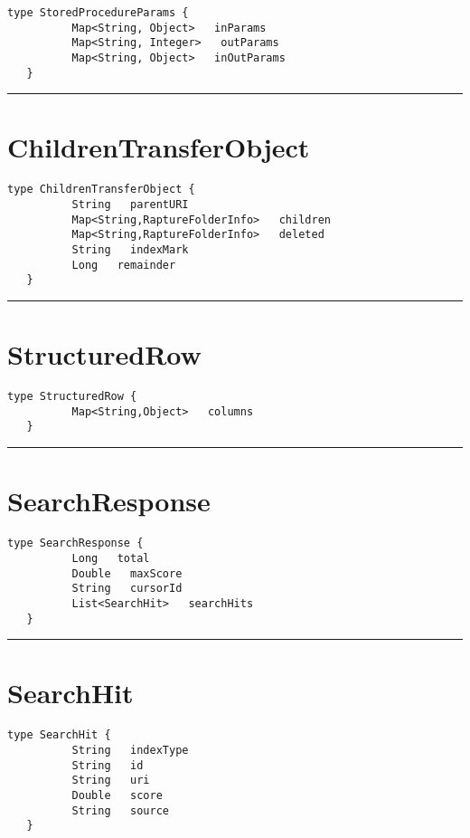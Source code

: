 \begin{lstlisting}[style=nonumbers]
   type StoredProcedureParams {
          Map<String, Object>   inParams
          Map<String, Integer>   outParams
          Map<String, Object>   inOutParams
   }
\end{lstlisting}

\rule{12cm}{2pt}
\section{ChildrenTransferObject}
\label{type:ChildrenTransferObject}

\begin{lstlisting}[style=nonumbers]
   type ChildrenTransferObject {
          String   parentURI
          Map<String,RaptureFolderInfo>   children
          Map<String,RaptureFolderInfo>   deleted
          String   indexMark
          Long   remainder
   }
\end{lstlisting}

\rule{12cm}{2pt}
\section{StructuredRow}
\label{type:StructuredRow}

\begin{lstlisting}[style=nonumbers]
   type StructuredRow {
          Map<String,Object>   columns
   }
\end{lstlisting}

\rule{12cm}{2pt}
\section{SearchResponse}
\label{type:SearchResponse}

\begin{lstlisting}[style=nonumbers]
   type SearchResponse {
          Long   total
          Double   maxScore
          String   cursorId
          List<SearchHit>   searchHits
   }
\end{lstlisting}

\rule{12cm}{2pt}
\section{SearchHit}
\label{type:SearchHit}

\begin{lstlisting}[style=nonumbers]
   type SearchHit {
          String   indexType
          String   id
          String   uri
          Double   score
          String   source
   }
\end{lstlisting}

